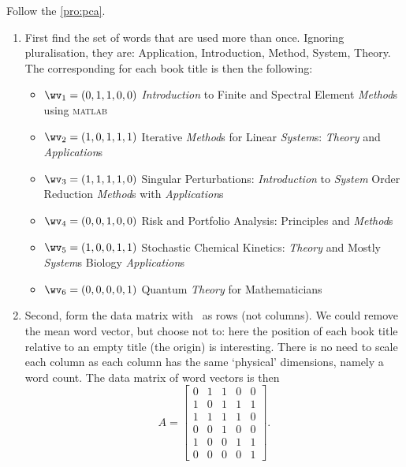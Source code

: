 Follow the  \autoref{pro:pca}.
\begin{enumerate}
\item 
First find the set of words that are used more than once.
Ignoring pluralisation, they are: 
Application, Introduction, Method, System, Theory.
The corresponding  for each book title is then the following:
\begin{itemize}
\item \(\wv_1=(0,1,1,0,0)\) \emph{Introduction} to Finite and Spectral Element \emph{Method}s using \textsc{matlab}
\item \(\wv_2=(1,0,1,1,1)\) Iterative \emph{Method}s for Linear \emph{System}s: \emph{Theory} and \emph{Application}s 
\item \(\wv_3=(1,1,1,1,0)\) Singular Perturbations: \emph{Introduction} to \emph{System} Order Reduction \emph{Method}s with \emph{Application}s 
\item \(\wv_4=(0,0,1,0,0)\) Risk and Portfolio Analysis: Principles and \emph{Method}s 
\item \(\wv_5=(1,0,0,1,1)\) Stochastic Chemical Kinetics: \emph{Theory} and Mostly \emph{System}s Biology \emph{Application}s
\item \(\wv_6=(0,0,0,0,1)\) Quantum \emph{Theory} for Mathematicians 
\end{itemize}

\item Second, form the data matrix with \hlist{}\ as rows (not columns).
We could remove the mean word vector, but choose not to: here the position of each book title relative to an empty title (the origin) is interesting.
There is no need to scale each column as each column has the same `physical' dimensions, namely a word count.
The data matrix of word vectors is then
\begin{equation*}
A=\begin{bmatrix} 0&1&1&0&0
\\1&0&1&1&1
\\1&1&1&1&0
\\0&0&1&0&0
\\1&0&0&1&1
\\0&0&0&0&1 \end{bmatrix}.
\end{equation*}
\setbox\ajrqrbox\hbox{}%
\marginpar{\usebox{\ajrqrbox\\[2ex]}}%



\end{enumerate}
